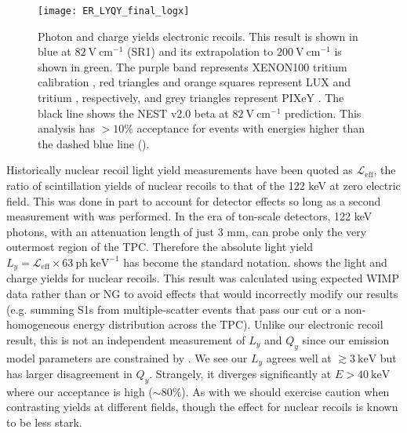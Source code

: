 \begin{figure}
\centering
\texttt{[image: ER\_LYQY\_final\_logx]}
\caption{Photon and charge yields electronic recoils.  This result is shown in blue at $82\ \mathrm{V\ cm^{-1}}$ (SR1) and its
extrapolation to $200\ \mathrm{V\ cm^{-1}}$ is shown in green.  The purple band represents XENON100 tritium calibration
, red triangles and orange squares represent
LUX   and tritium , respectively, and grey triangles represent PIXeY 
.  The black line shows the NEST v2.0 beta at $82\ \mathrm{V\ cm^{-1}}$ prediction.  This analysis has $> 10\%$
acceptance for events with energies higher than the dashed blue line ().}
\label{fig:er_nr_calibrations_results_ly_qy_er}
\end{figure}

Historically nuclear recoil light yield measurements have been quoted as
$\mathcal{L}_{\mathrm{eff}}$, the ratio of scintillation yields of nuclear recoils to that of the  122 keV \gammaray at zero
electric field.  This was done in part to account for detector effects so long as a second measurement with  was
performed.  In the era of ton-scale detectors, 122 keV photons, with an attenuation length of just 3 mm, can probe only the very
outermost region of the TPC.  Therefore the absolute light yield $L_y = \mathcal{L}_{\mathrm{eff}} \times 63\ \mathrm{ph\ keV^{-1}}$ has
become the standard notation.   shows the light and charge yields for nuclear
recoils.  This result was calculated using expected WIMP data rather than \ambe or NG to avoid effects that would incorrectly modify
our results (e.g. summing S1s from multiple-scatter events that pass our cut or a non-homogeneous energy distribution across the
TPC).  Unlike our electronic recoil result, this is not an independent measurement of $L_y$ and $Q_y$ since our emission model parameters
are constrained by .  We
see our $L_y$ agrees well at $\gtrsim 3\ \mathrm{keV}$ but has larger disagreement in $Q_y$.  Strangely, it diverges significantly at
$E > 40\ \mathrm{keV}$ where our acceptance is high (${\sim} 80\%$).  As with  we should
exercise caution when contrasting yields at different fields, though the effect for nuclear recoils is known to be less stark.

